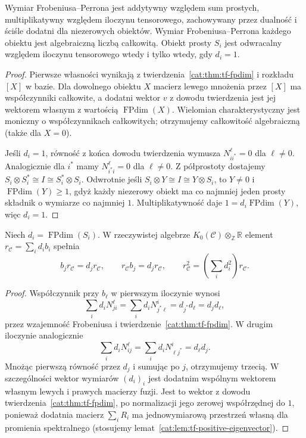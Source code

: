\begin{wniosek}\label{cat:cor:tf-fpdim-properties}
Wymiar Frobeniusa--Perrona jest addytywny względem sum prostych, multiplikatywny względem iloczynu tensorowego, zachowywany przez dualność i ściśle dodatni dla niezerowych obiektów. Wymiar Frobeniusa--Perrona każdego obiektu jest algebraiczną liczbą całkowitą. Obiekt prosty $S_i$ jest odwracalny względem iloczynu tensorowego wtedy i tylko wtedy, gdy $d_i=1$.
\end{wniosek}
\begin{proof}
Pierwsze własności wynikają z twierdzenia~\ref{cat:thm:tf-fpdim} i rozkładu $[X]$ w bazie. Dla dowolnego obiektu $X$ macierz lewego mnożenia przez $[X]$ ma współczynniki całkowite, a dodatni wektor $v$ z dowodu twierdzenia jest jej wektorem własnym z wartością $\operatorname{FPdim}(X)$. Wielomian charakterystyczny jest moniczny o współczynnikach całkowitych; otrzymujemy całkowitość algebraiczną (także dla $X=0$).

Jeśli $d_i=1$, równość z końca dowodu twierdzenia wymusza $N_{ii^*}^{\ell}=0$ dla $\ell\neq0$. Analogicznie dla $i^*$ mamy $N_{i^*i}^{\ell}=0$ dla $\ell\neq0$. Z półprostoty dostajemy $S_i\otimes S_i^*\cong I\cong S_i^*\otimes S_i$. Odwrotnie jeśli $S_i\otimes Y\cong I\cong Y\otimes S_i$, to $Y\neq0$ i $\operatorname{FPdim}(Y)\geq1$, gdyż każdy niezerowy obiekt ma co najmniej jeden prosty składnik o wymiarze co najmniej $1$. Multiplikatywność daje $1=d_i\operatorname{FPdim}(Y)$, więc $d_i=1$.
\end{proof}

\begin{stwierdzenie}\label{cat:prop:tf-regular-element}
Niech $d_i=\operatorname{FPdim}(S_i)$. W rzeczywistej algebrze $K_0(\mathcal C)\otimes_{\mathbb Z}\mathbb R$ element $r_{\mathcal C}=\sum_i d_i b_i$ spełnia
\[
 b_jr_{\mathcal C}=d_j r_{\mathcal C},
 \qquad
 r_{\mathcal C}b_j=d_j r_{\mathcal C},
 \qquad
 r_{\mathcal C}^2=\left(\sum_i d_i^2\right)r_{\mathcal C}.
\]
\end{stwierdzenie}
\begin{proof}
Współczynnik przy $b_\ell$ w pierwszym iloczynie wynosi
\[
 \sum_i d_iN_{ji}^{\ell}
 =\sum_i d_iN_{j^*\ell}^{i}=d_{j^*}d_\ell=d_jd_\ell,
\]
przez wzajemność Frobeniusa i twierdzenie~\ref{cat:thm:tf-fpdim}. W drugim iloczynie analogicznie
\[
 \sum_i d_iN_{ij}^{\ell}
 =\sum_i d_iN_{\ell j^*}^{i}=d_\ell d_j.
\]
Mnożąc pierwszą równość przez $d_j$ i sumując po $j$, otrzymujemy trzecią. W szczególności wektor wymiarów $(d_i)_i$ jest dodatnim wspólnym wektorem własnym lewych i prawych macierzy fuzji. Jest to wektor z dowodu twierdzenia~\ref{cat:thm:tf-fpdim}, po normalizacji jego zerowej współrzędnej do $1$, ponieważ dodatnia macierz $\sum_i R_i$ ma jednowymiarową przestrzeń własną dla promienia spektralnego (stosujemy lemat~\ref{cat:lem:tf-positive-eigenvector}).
\end{proof}

